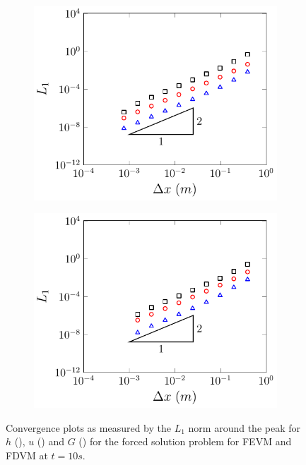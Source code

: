 \begin{figure}
	\centering
	\begin{subfigure}{0.5\textwidth}
		\includegraphics[width=\textwidth]{./chp5/figures/Forced/Dry/P2P/FEVML1red.pdf}
		\vspace{0.5cm}
	\end{subfigure}%
	\begin{subfigure}{0.5\textwidth}
		\includegraphics[width=\textwidth]{./chp5/figures/Forced/Dry/P2P/FDVML1red.pdf}
		\vspace{0.5cm}
	\end{subfigure}
	\caption{Convergence plots as measured by the $L_1$ norm around the peak for $h$ (), $u$ () and $G$ () for the forced solution problem for FEVM and FDVM at $t=10s$.}
\end{figure}
